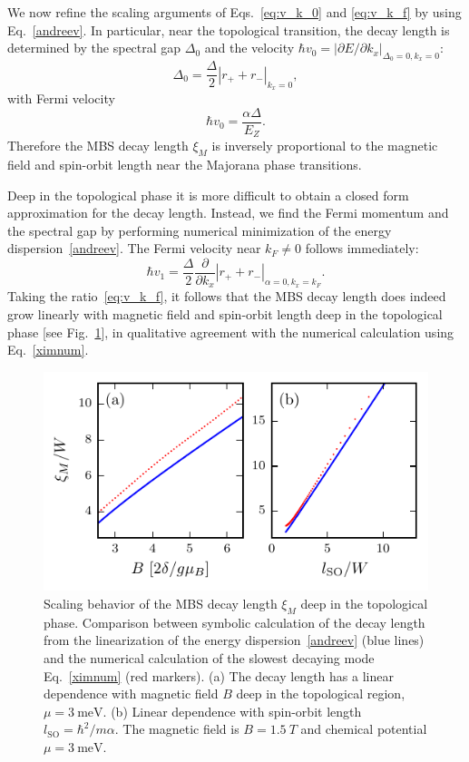 We now refine the scaling arguments of Eqs.~\eqref{eq:v_k_0} and \eqref{eq:v_k_f} by using Eq.~\eqref{andreev}.
In particular, near the topological transition, the decay length is determined by the spectral gap $\Delta_0$ and the velocity $\hbar v_0=|\partial E/\partial k_x|_{\Delta_0=0,k_x=0}$:
\begin{equation}
\Delta_0=\frac{\Delta}{2}|r_++r_-|_{k_x=0},
\end{equation}
with Fermi velocity
\begin{equation}
\hbar v_0=\frac{\alpha\Delta}{E_Z}.
\end{equation}
Therefore the MBS decay length $\xi_M$ is inversely proportional to the magnetic field and spin-orbit length near the Majorana phase transitions.

Deep in the topological phase it is more difficult to obtain a closed form approximation for the decay length.
Instead, we find the Fermi momentum and the spectral gap by performing numerical minimization of the energy dispersion~\eqref{andreev}.
The Fermi velocity near $k_F\ne 0$ follows immediately:
\begin{equation}
\hbar v_1=\frac{\Delta}{2}\frac{\partial}{\partial k_x}|r_++r_-|_{\alpha=0,k_x=k_F}.
\end{equation}
Taking the ratio~\eqref{eq:v_k_f}, it follows that the MBS decay length does indeed grow linearly with magnetic field and spin-orbit length deep in the topological phase [see Fig.~\ref{fig:compAB}], in qualitative agreement with the numerical calculation using Eq.~\eqref{ximnum}.

\begin{figure}
\begin{center}
\includegraphics[width=0.7\columnwidth]{chapter_shortjunction/figures/compAB}
\caption{
Scaling behavior of the MBS decay length $\xi_M$ deep in the topological phase.
Comparison between symbolic calculation of the decay length from the linearization of the energy dispersion~\eqref{andreev} (blue lines) and the numerical calculation of the slowest decaying mode Eq.~\eqref{ximnum} (red markers).
(a) The decay length has a linear dependence with magnetic field $B$ deep in the topological region, $\mu=\SI{3}{\meV}$.
(b) Linear dependence with spin-orbit length $l_\mathrm{SO}=\hbar^2/m\alpha$.
The magnetic field is $B=\SI{1.5}{T}$ and chemical potential $\mu=\SI{3}{\meV}$.}
\label{fig:compAB}
\end{center}
\end{figure}

